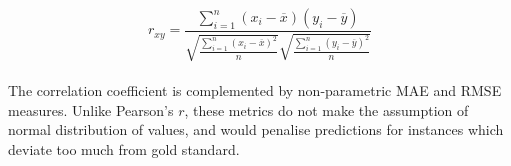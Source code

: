 
\begin{equation}\label{eq:pearson}
	r_{xy} = \frac{{}\sum_{i=1}^{n} (x_i - \overline{x})(y_i - \overline{y})}
	{\sqrt{\frac{\sum_{i=1}^{n} (x_i - \overline{x})^2}{n}}\sqrt{\frac{\sum_{i=1}^{n}(y_i - \overline{y})^2}{n}}}
\end{equation}
\\
The correlation coefficient is complemented by non-parametric \gls{MAE} and \gls{RMSE} measures. Unlike Pearson's $r$, these metrics do not make the assumption of normal distribution of values, and would penalise predictions for instances which deviate too much from gold standard. 

%


